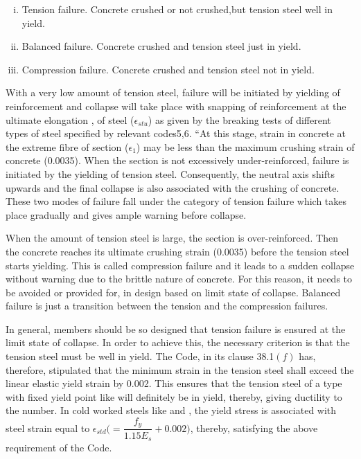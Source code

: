 \begin{enumerate}[(i)]
\item Tension failure. Concrete crushed or not crushed,but tension steel well in yield.
\item Balanced failure. Concrete crushed and tension steel just in yield.
\item Compression failure. Concrete crushed and tension steel not in yield.
\end{enumerate}
With a very low amount of tension steel, failure will be initiated by
yielding of reinforcement and collapse will take place with snapping of
reinforcement at the ultimate elongation , of steel ($\epsilon_{stu}$) as
given by the breaking tests of different types of steel speciﬁed by
relevant codes5,6. “At this stage, strain in concrete at the extreme
fibre of section ($\epsilon_1$) may be less than the maximum crushing
strain of concrete (0.0035). When the section is not excessively
under-reinforced, failure is initiated by the yielding of tension steel.
Consequently, the neutral axis shifts upwards and the final collapse is
also associated with the crushing of concrete. These two modes of failure
fall under the category of tension failure which takes place gradually
and gives ample warning before collapse.

When the amount of tension steel is large, the section is over-reinforced.
Then the concrete reaches its ultimate crushing strain (0.0035)
before the tension steel starts yielding. This is called compression
failure and it leads to a sudden collapse without warning due to the
brittle nature of concrete. For this reason, it needs to be avoided or
provided for, in design based on limit state of collapse. Balanced
failure is just a transition between the tension and the compression
failures.

In general, members should be so designed that tension failure
is ensured at the limit state of collapse. In order to achieve this, the
necessary criterion is that the tension steel must be well in yield. The
Code, in its clause 38.1$(f)$ has, therefore, stipulated that the minimum
strain in the tension steel shall exceed the linear elastic yield strain
by 0.002. This ensures that the tension steel of a type with fixed yield
point like {\fetwofivezero} will deﬁnitely be in yield, thereby, giving
ductility to the number. In cold worked steels like {\fefouronefive} and
{\fefivezerozero}, the yield stress is associated with steel strain equal to              
$\epsilon_{std}\Bigg(=\dfrac{f_y}{1.15 E_s}+0.002\Bigg)$, thereby,
satisfying the above requirement of the Code.

